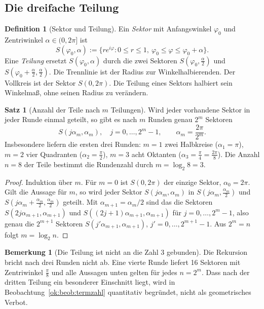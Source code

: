 \documentclass[a4paper,12pt,twoside]{report}
\theoremstyle{definition}
\newtheorem{definition}{Definition}
\newtheorem{satz}{Satz}
\newtheorem{bemerkung}{Bemerkung}
\begin{document}
\subsection{Die dreifache Teilung}
\label{sec:ok:teilung}

\begin{definition}[Sektor und Teilung]
Ein \emph{Sektor} mit Anfangswinkel $\varphi_0$ und Zentriwinkel $\alpha\in(0,2\pi]$ ist
\[
S(\varphi_0,\alpha):=\{re^{i\varphi}: 0\le r\le1,\ \varphi_0\le\varphi\le\varphi_0+\alpha\}.
\]
Eine \emph{Teilung} ersetzt $S(\varphi_0,\alpha)$ durch die zwei Sektoren $S(\varphi_0,\tfrac\alpha2)$ und $S(\varphi_0+\tfrac\alpha2,\tfrac\alpha2)$. Die Trennlinie ist der Radius zur Winkelhalbierenden. Der Vollkreis ist der Sektor $S(0,2\pi)$. Die Teilung eines Sektors halbiert sein Winkelmaß, ohne seinen Radius zu verändern.
\end{definition}

\begin{satz}[Anzahl der Teile nach $m$ Teilungen]\label{ok:satz:teilung}
Wird jeder vorhandene Sektor in jeder Runde einmal geteilt, so gibt es nach $m$ Runden genau $2^m$ Sektoren
\[
S(j\alpha_m,\alpha_m),\quad j=0,\dots,2^m-1,\qquad \alpha_m=\frac{2\pi}{2^m}.
\]
Insbesondere liefern die ersten drei Runden: $m=1$ zwei Halbkreise ($\alpha_1=\pi$), $m=2$ vier Quadranten ($\alpha_2=\frac\pi2$), $m=3$ acht Oktanten ($\alpha_3=\frac\pi4=\frac{2\pi}{8}$). Die Anzahl $n=8$ der Teile bestimmt die Rundenzahl durch $m=\log_2 8=3$.
\end{satz}

\begin{proof}
Induktion über $m$. Für $m=0$ ist $S(0,2\pi)$ der einzige Sektor, $\alpha_0=2\pi$. Gilt die Aussage für $m$, so wird jeder Sektor $S(j\alpha_m,\alpha_m)$ in $S(j\alpha_m,\tfrac{\alpha_m}{2})$ und $S(j\alpha_m+\tfrac{\alpha_m}{2},\tfrac{\alpha_m}{2})$ geteilt. Mit $\alpha_{m+1}=\alpha_m/2$ sind das die Sektoren $S(2j\alpha_{m+1},\alpha_{m+1})$ und $S((2j+1)\alpha_{m+1},\alpha_{m+1})$ für $j=0,\dots,2^m-1$, also genau die $2^{m+1}$ Sektoren $S(j'\alpha_{m+1},\alpha_{m+1})$, $j'=0,\dots,2^{m+1}-1$. Aus $2^m=n$ folgt $m=\log_2 n$.
\end{proof}

\begin{bemerkung}[Die Teilung ist nicht an die Zahl 3 gebunden]\label{ok:bem:vier}
Die Rekursion bricht nach drei Runden nicht ab. Eine vierte Runde liefert 16 Sektoren mit Zentriwinkel $\frac\pi8$ und alle Aussagen unten gelten für jedes $n=2^m$. Dass nach der dritten Teilung ein besonderer Einschnitt liegt, wird in Beobachtung~\ref{ok:beob:termzahl} quantitativ begründet, nicht als geometrisches Verbot.
\end{bemerkung}
\end{document}
